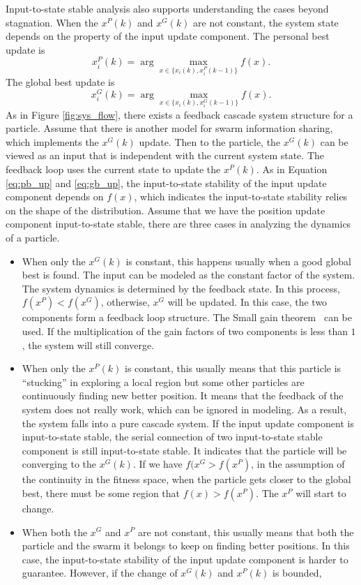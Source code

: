\documentclass{sig-alternate}
\begin{document}
Input-to-state stable analysis also supports understanding the cases beyond stagnation.
When the $ x^{P}(k) $ and $ x^{G}(k) $ are not constant, the system state depends on the property of the input update component.
The personal best update is
\begin{equation}
\label{eq:pb_up}
x_{i}^{P}(k) = \arg \max_{ x \in \{ x_{i}(k), x_{i}^{P}(k-1) \} } f(x).
\end{equation}
The global best update is
\begin{equation}
\label{eq:gb_up}
x_{i}^{G}(k) = \arg \max_{ x \in \{ x_{i}(k), x_{i}^{G}(k-1) \} } f(x).
\end{equation}
As in Figure \ref{fig:sys_flow}, there exists a feedback cascade system structure for a particle.
Assume that there is another model for swarm information sharing, which implements the $ x^{G}(k) $ update.
Then to the particle, the $ x^{G}(k) $ can be viewed as an input that is independent with the current system state.
The feedback loop uses the current state to update the $ x^{P}(k) $.
As in Equation \eqref{eq:pb_up} and \eqref{eq:gb_up}, the input-to-state stability of the input update component depends on $ f(x) $, which indicates the input-to-state stability relies on the shape of the distribution.
Assume that we have the position update component input-to-state stable, there are three cases in analyzing the dynamics of a particle.
\begin{itemize}
\item When only the $ x^{G} (k) $ is constant, this happens usually when a good global best is found.
The input can be modeled as the constant factor of the system. 
The system dynamics is determined by the feedback state.
In this process, $ f(x^{P}) < f(x^{G}) $, otherwise, $ x^{G} $ will be updated.
In this case, the two components form a feedback loop structure.
The Small gain theorem~\cite{Jiang2001857} can be used.
If the multiplication of the gain factors of two components is less than $ 1 $, the system will still converge.
\item When only the $ x^{P} (k) $ is constant, this usually means that this particle is ``stucking'' in exploring a local region but some other particles are continuously finding new better position. 
It means that the feedback of the system does not really work, which can be ignored in modeling.
As a result, the system falls into a pure cascade system.
If the input update component is input-to-state stable, the serial connection of two input-to-state stable component is still input-to-state stable.
It indicates that the particle will be converging to the $ x^{G} (k) $.
If we have  $ f(x^{G} > f(x^{P}) $, in the assumption of the continuity in the fitness space, when the particle gets closer to the global best, there must be some region that $ f(x) > f(x^{P}) $.
The $ x^{P} $ will start to change.
\item When both the $ x^{G} $ and $ x^{P} $ are not constant, this usually means that both the particle and the swarm it belongs to keep on finding better positions.
In this case, the input-to-state stability of the input update component is harder to guarantee.
However, if the change of $ x^{G}(k) $ and $  x^{P}(k) $ is bounded, 
\end{itemize}
\end{document}
